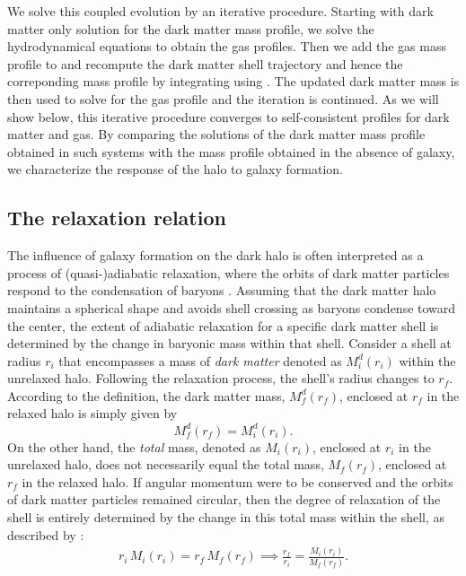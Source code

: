 We solve this coupled evolution by an iterative procedure. Starting with dark matter only solution for the dark matter mass profile, we solve the hydrodynamical equations to obtain the gas profiles. Then we add the gas mass profile to  and recompute the dark matter shell trajectory and hence the correponding mass profile by integrating using . The updated dark matter mass is then used to solve for the gas profile and the iteration is continued. As we will show below, this iterative procedure converges to self-consistent profiles for dark matter and gas. By comparing the solutions of the dark matter mass profile obtained in such systems with the mass profile obtained in the absence of galaxy, we characterize the response of the halo to galaxy formation.

\subsection*{The relaxation relation}
\label{sec:methods-relx-reln-ch:ssr}
The influence of galaxy formation on the dark halo is often interpreted as a process of (quasi-)adiabatic relaxation, where the orbits of dark matter particles respond to the condensation of baryons \citep[][]{1986Blumenthal,2010Abadi_NFBS,2011TeyssierMMDM,2023Velmani&Paranjape}. Assuming that the dark matter halo maintains a spherical shape and avoids shell crossing as baryons condense toward the center, the extent of adiabatic relaxation for a specific dark matter shell is determined by the change in baryonic mass within that shell. Consider a shell at radius $r_i$ that encompasses a mass of \emph{dark matter} denoted as $M_i^d(r_i)$ within the unrelaxed halo. Following the relaxation process, the shell's radius changes to $r_f$. According to the definition, the dark matter mass, $M_f^d(r_f)$, enclosed at $r_f$ in the relaxed halo is simply given by
\begin{equation}
M_f^d(r_f) = M_i^d(r_i).
\label{eq:DMmass-ch:ssr}
\end{equation}
On the other hand, the \emph{total} mass, denoted as $M_i(r_i)$, enclosed at $r_i$ in the unrelaxed halo, does not necessarily equal the total mass, $M_f(r_f)$, enclosed at $r_f$ in the relaxed halo. If angular momentum were to be conserved and the orbits of dark matter particles remained circular, then the degree of relaxation of the shell is entirely determined by the change in this total mass within the shell, as described by \citep[][]{1986Blumenthal}:
\begin{align}
r_i \,M_i(r_i) = r_f \,M_f(r_f) %
\implies 
\frac{r_f}{r_i} = \frac{M_i(r_i)}{M_f(r_f)}.
\label{eq:AR-ch:ssr}
\end{align}
